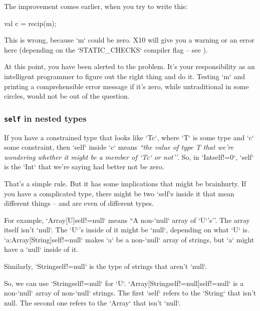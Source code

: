 \begin{description}
      The improvement comes earlier, when you try to write this: 
\begin{xten}
    val c = recip(m); 
\end{xten}
      This is wrong, because \xcd`m` could be zero.  
      X10 will give you a warning or an error here (depending on the 
      \xcd`STATIC_CHECKS` compiler flag -- see ).  

      At this point, you have been alerted to the problem. It's your
      responsibility as an intelligent programmer to figure out the right
      thing and do it.  Testing \xcd`m` and printing a comprehensible error
      message if it's zero, while untraditional in some circles, would not be
      out of the question.

\end{description}

\subsubsection{{\tt self} in nested types}
\label{sect:NullTestsNested}

If you have a constrained type that looks like \xcd`T{c}`, where \xcd`T` is
some type and \xcd`c` some constraint, then \xcd`self` inside \xcd`c` means
{\em ``the value of type T that we're wondering whether it might be a member
of \xcd`T{c}` or not''}.  So, in \xcd`Int{self!=0}`, \xcd`self` is the
\xcd`Int` that we're saying had better not be zero.

That's a simple rule.  But it has some implications that might be brainhurty.
If you have a complicated type, there might be two \xcd`self`s inside it that
mean different things -- and are even of different types.

For example, \xcd`Array[U]{self!=null}` means ``A non-\xcd`null` array of
\xcd`U`'s''. The array itself isn't \xcd`null`. The \xcd`U`'s inside of it
might be \xcd`null`, depending on what \xcd`U` is.
\xcd`a:Array[String]{self!=null}` makes \xcd`a` be a non-\xcd`null` array of
strings, but \xcd`a` might have a \xcd`null` inside of it.

Similarly, \xcd`String{self!=null}` is the type of strings that aren't
\xcd`null`.  

So, we can use \xcd`String{self!=null}` for \xcd`U`.  
\xcd`Array[String{self!=null}]{self!=null}` is a non-\xcd`null` array of
non-\xcd`null` strings.  The first \xcd`self` refers to the \xcd`String` that
isn't null. The second one refers to the \xcd`Array` that isn't \xcd`null`.


